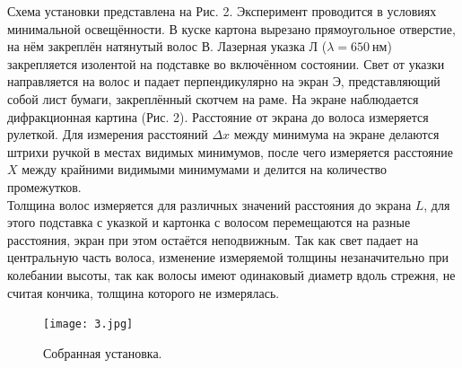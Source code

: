 \documentclass[a4paper,12pt]{article}
\begin{document}
Схема установки представлена на Рис. 2. Эксперимент проводится в условиях минимальной освещённости. В куске картона вырезано прямоугольное отверстие, на нём закреплён натянутый волос В. Лазерная указка Л ($\lambda = 650~\text{нм}$) закрепляется изолентой на подставке во включённом состоянии. Свет от указки направляется на волос и падает перпендикулярно на экран Э, представляющий собой лист бумаги, закреплённый скотчем на раме. На экране наблюдается дифракционная картина (Рис. 2). Расстояние от экрана до волоса измеряется рулеткой. Для измерения расстояний $\Delta x$ между минимума на экране делаются штрихи ручкой в местах видимых минимумов, после чего измеряется расстояние $X$ между крайними видимыми минимумами и делится на количество промежутков.\\
Толщина волос измеряется для различных значений расстояния до экрана $L$, для этого подставка с указкой и картонка с волосом перемещаются на разные расстояния, экран при этом остаётся неподвижным. Так как свет падает на центральную часть волоса, изменение измеряемой толщины незаначительно при колебании высоты, так как волосы имеют одинаковый диаметр вдоль стрежня, не считая кончика, толщина которого не измерялась.

\begin{figure}
\begin{center}
\texttt{[image: 3.jpg]}
\end{center}
\caption{Собранная установка.} 
\end{figure}
\end{document}
